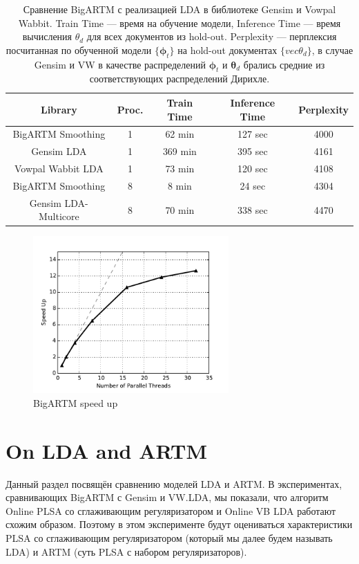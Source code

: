\documentclass{article}
\renewcommand{\vec}[1]{{\boldsymbol #1}}
\begin{document}
\begin{table}
	\centering
	\label{tab:libraries_comparison}

	\begin{tabular}[t]{c|c|ccc}
	\hline
	Library & Proc. & Train Time & Inference Time & Perplexity \\
	\hline
	BigARTM Smoothing & 1 & 62 min & 127 sec & 4000 \\
	Gensim LDA & 1 & 369 min & 395 sec & 4161 \\
	Vowpal Wabbit LDA & 1 & 73 min & 120 sec & 4108 \\
	\hline
	BigARTM Smoothing & 8 & 8 min & 24 sec & 4304 \\
	Gensim LDA-Multicore & 8 & 70 min & 338 sec & 4470 \\
	\end{tabular}
	\caption{Сравнение BigARTM с реализацией LDA в библиотеке Gensim и Vowpal Wabbit. Train Time — время на обучение модели, Inference Time — время вычисления $\theta_d$ для всех документов из hold-out. Perplexity — перплексия посчитанная по обученной модели $\{\vec{\phi}_t\}$ на hold-out документах $\{vec{\theta}_d\}$, в случае Gensim и VW в качестве распределений $\vec{\phi}_t$ и $\vec{\theta}_d$ брались средние из соответствующих распределений Дирихле.}
\end{table}

\begin{figure}
	\centering
	\label{fig:bigartm_speedup}
	\includegraphics[height=6cm]{bigartm_speedup}
	\caption{BigARTM speed up }
\end{figure}



\section{On LDA and ARTM}

Данный раздел посвящён сравнению моделей LDA и ARTM. В экспериментах, сравнивающих BigARTM с Gensim и VW.LDA, мы показали, что алгоритм Online PLSA со сглаживающим регуляризатором и Online VB LDA работают схожим образом. Поэтому в этом эксперименте будут оцениваться характеристики PLSA со сглаживающим регуляризатором (который мы далее будем называть LDA) и ARTM (суть PLSA с набором регуляризаторов).
\end{document}
